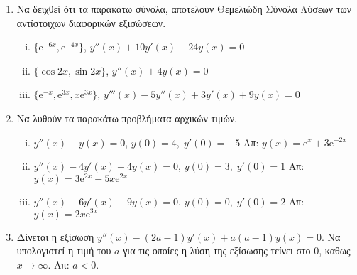 


\pagestyle{askhseis}
\everymath{\displaystyle}





\begin{center}
\end{center}

\vspace{\baselineskip}

\begin{enumerate}
  \item Να δειχθεί ότι τα  παρακάτω σύνολα, αποτελούν Θεμελιώδη Σύνολα Λύσεων των 
    αντίστοιχων διαφορικών εξισώσεων.
    \begin{enumerate}[i)]
      \item $ \{ \mathrm{e}^{-6x}, \mathrm{e}^{-4x} \} $,\quad 
        $ y''(x)+10y'(x)+24y(x)=0 $ 
      \item $ \{ \cos{2x}, \sin{2x} \}$, \quad $ y''(x)+4y(x)=0 $
      \item $ \{ \mathrm{e}^{-x}, \mathrm{e}^{3x}, x\mathrm{e}^{3x} \} $, 
        \quad $ y'''(x)-5y''(x)+3y'(x)+9y(x)=0 $
    \end{enumerate}

  \item Να λυθούν τα παρακάτω προβλήματα αρχικών τιμών.
    \begin{enumerate}[i)]
      \item $ y''(x) - y(x)=0 $, \quad $ y(0)=4, \; y'(0)=-5 $ 
        \hfill Απ:  $ y(x)= \mathrm{e}^{x}+3 \mathrm{e}^{-2x} $ 
      \item $ y''(x)-4y'(x)+4y(x)=0 $, \quad $ y(0)=3, \; y'(0)=1 $ 
        \hfill Απ:  $ y(x)=3 \mathrm{e}^{2x} - 5x \mathrm{e}^{2x} $
      \item $ y''(x)-6y'(x)+9y(x)=0 $, \quad $ y(0)=0, \; y'(0)=2 $ 
        \hfill Απ:  $ y(x)=2x \mathrm{e}^{3x} $
    \end{enumerate}

  \item Δίνεται η εξίσωση $ y''(x)-(2a-1)y'(x)+a(a-1)y(x)=0 $. Να υπολογιστεί 
    η τιμή του $a$ για τις οποίες η λύση της εξίσωσης τείνει στο 0, καθως 
    $ x \to \infty $.
    \hfill Απ: $ a<0 $. 


\end{enumerate}
